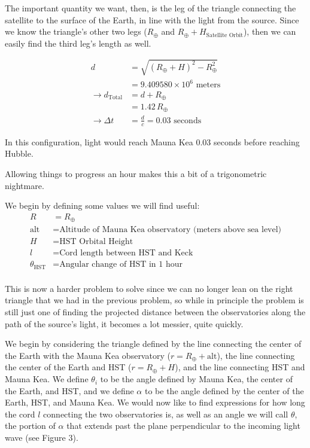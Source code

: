 \documentclass[12pt]{article}
\begin{document}
\begin{onehalfspacing}
The important quantity we want, then, is the leg of the triangle connecting the satellite to the surface of the Earth, in line with the light from the source. Since we know the triangle's other two legs ($R_{\oplus}$ and $R_{\oplus} + H_{\text{Satellite Orbit}}$), then we can easily find the third leg's length as well.

\begin{align*}
  d &= \sqrt{(R_{\oplus} + H)^2 - R_{\oplus}^2} \\
    &= 9.409580 \times 10^6 \text{ meters} \\
  \rightarrow d_{\text{Total}} &= d + R_{\oplus} \\
                   &= 1.42\, R_{\oplus} \\
  \rightarrow \Delta t &= \frac{d}{c} = 0.03 \text{ seconds}
\end{align*}

In this configuration, light would reach Mauna Kea 0.03 seconds before reaching Hubble. \bigskip

Allowing things to progress an hour makes this a bit of a trigonometric nightmare.

We begin by defining some values we will find useful:
\begin{align*}
  R &= R_{\oplus}\\
  \text{alt} &= \text{Altitude of Mauna Kea observatory (meters above sea level)} \\
  H &= \text{HST Orbital Height} \\
  l &= \text{Cord length between HST and Keck}\\
  \theta_{\text{HST}} &= \text{Angular change of HST in 1 hour} \\
\end{align*}

This is now a harder problem to solve since we can no longer lean on the right triangle that we had in the previous problem, so while in principle the problem is still just one of finding the projected distance between the observatories along the path of the source's light, it becomes a lot messier, quite quickly. \bigskip

We begin by considering the triangle defined by the line connecting the center of the Earth with the Mauna Kea observatory ($r = R_{\oplus} + \text{alt}$), the line connecting the center of the Earth and HST ($r = R_{\oplus} + H$), and the line connecting HST and Mauna Kea. We define $\theta_i$ to be the angle defined by Mauna Kea, the center of the Earth, and HST, and we define $\alpha$ to be the angle defined by the center of the Earth, HST, and Mauna Kea. We would now like to find expressions for how long the cord $l$ connecting the two observatories is, as well as an angle we will call $\theta$, the portion of $\alpha$ that extends past the plane perpendicular to the incoming light wave (see Figure 3). \bigskip



\end{onehalfspacing}
\end{document}
